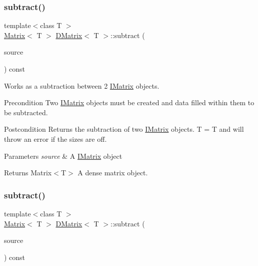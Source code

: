 \subsubsection{\texorpdfstring{subtract()}{subtract()}\hspace{0.1cm}{\footnotesize\ttfamily [5/6]}}
{\footnotesize\ttfamily template$<$class T $>$ \\
\mbox{\hyperlink{class_matrix}{Matrix}}$<$ T $>$ \mbox{\hyperlink{class_d_matrix}{D\+Matrix}}$<$ T $>$\+::subtract (\begin{DoxyParamCaption}\item[{const \mbox{\hyperlink{class_i_matrix}{I\+Matrix}}$<$ \mbox{\hyperlink{class_s_matrix}{S\+Matrix}}$<$ T $>$, T $>$ \&}]{source }\end{DoxyParamCaption}) const}



Works as a subtraction between 2 \mbox{\hyperlink{class_i_matrix}{I\+Matrix}} objects. 

\begin{DoxyPrecond}{Precondition}
Two \mbox{\hyperlink{class_i_matrix}{I\+Matrix}} objects must be created and data filled within them to be subtracted. 
\end{DoxyPrecond}
\begin{DoxyPostcond}{Postcondition}
Returns the subtraction of two \mbox{\hyperlink{class_i_matrix}{I\+Matrix}} objects. T = T and will throw an error if the sizes are off.
\end{DoxyPostcond}

\begin{DoxyParams}{Parameters}
{\em source} & A \mbox{\hyperlink{class_i_matrix}{I\+Matrix}} object \\
\hline
\end{DoxyParams}
\begin{DoxyReturn}{Returns}
Matrix$<$\+T$>$ A dense matrix object. 
\end{DoxyReturn}
\mbox{\label{class_d_matrix_a7a06d954882f3853d3e735a6c550a715}} 
\subsubsection{\texorpdfstring{subtract()}{subtract()}\hspace{0.1cm}{\footnotesize\ttfamily [6/6]}}
{\footnotesize\ttfamily template$<$class T $>$ \\
\mbox{\hyperlink{class_matrix}{Matrix}}$<$ T $>$ \mbox{\hyperlink{class_d_matrix}{D\+Matrix}}$<$ T $>$\+::subtract (\begin{DoxyParamCaption}\item[{const \mbox{\hyperlink{class_i_matrix}{I\+Matrix}}$<$ \mbox{\hyperlink{class_d_matrix}{D\+Matrix}}$<$ T $>$, T $>$ \&}]{source }\end{DoxyParamCaption}) const\hspace{0.3cm}{\ttfamily [virtual]}}



